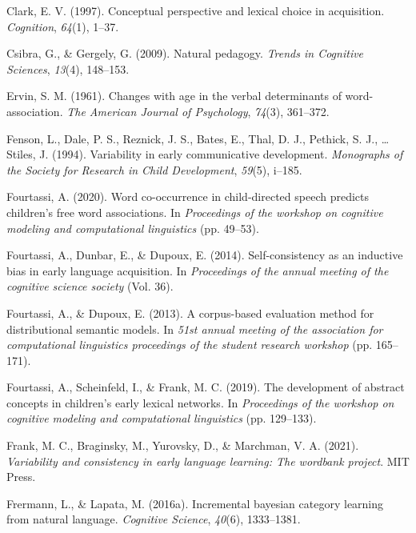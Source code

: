 \documentclass[english,,man]{apa6}
\begin{document}
\leavevmode\hypertarget{ref-clark1997}{}%
Clark, E. V. (1997). Conceptual perspective and lexical choice in acquisition. \emph{Cognition}, \emph{64}(1), 1--37.

\leavevmode\hypertarget{ref-csibra2009}{}%
Csibra, G., \& Gergely, G. (2009). Natural pedagogy. \emph{Trends in Cognitive Sciences}, \emph{13}(4), 148--153.

\leavevmode\hypertarget{ref-ervin1961changes}{}%
Ervin, S. M. (1961). Changes with age in the verbal determinants of word-association. \emph{The American Journal of Psychology}, \emph{74}(3), 361--372.

\leavevmode\hypertarget{ref-fenson94}{}%
Fenson, L., Dale, P. S., Reznick, J. S., Bates, E., Thal, D. J., Pethick, S. J., \ldots{} Stiles, J. (1994). Variability in early communicative development. \emph{Monographs of the Society for Research in Child Development}, \emph{59}(5), i--185.

\leavevmode\hypertarget{ref-fourtassi2020word}{}%
Fourtassi, A. (2020). Word co-occurrence in child-directed speech predicts children's free word associations. In \emph{Proceedings of the workshop on cognitive modeling and computational linguistics} (pp. 49--53).

\leavevmode\hypertarget{ref-fourtassi2014}{}%
Fourtassi, A., Dunbar, E., \& Dupoux, E. (2014). Self-consistency as an inductive bias in early language acquisition. In \emph{Proceedings of the annual meeting of the cognitive science society} (Vol. 36).

\leavevmode\hypertarget{ref-fourtassi2013}{}%
Fourtassi, A., \& Dupoux, E. (2013). A corpus-based evaluation method for distributional semantic models. In \emph{51st annual meeting of the association for computational linguistics proceedings of the student research workshop} (pp. 165--171).

\leavevmode\hypertarget{ref-fourtassi2019}{}%
Fourtassi, A., Scheinfeld, I., \& Frank, M. C. (2019). The development of abstract concepts in children's early lexical networks. In \emph{Proceedings of the workshop on cognitive modeling and computational linguistics} (pp. 129--133).

\leavevmode\hypertarget{ref-frank2021variability}{}%
Frank, M. C., Braginsky, M., Yurovsky, D., \& Marchman, V. A. (2021). \emph{Variability and consistency in early language learning: The wordbank project}. MIT Press.

\leavevmode\hypertarget{ref-frermann2016}{}%
Frermann, L., \& Lapata, M. (2016a). Incremental bayesian category learning from natural language. \emph{Cognitive Science}, \emph{40}(6), 1333--1381.
\end{document}
